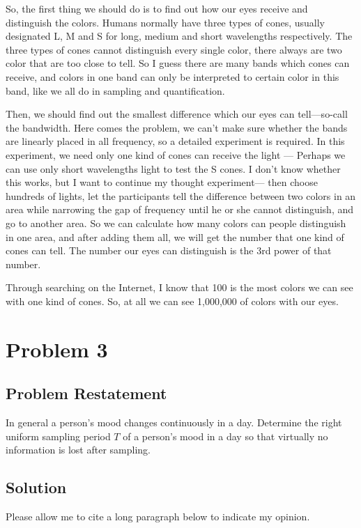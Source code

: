\documentclass{article}
\begin{document}
So, the first thing we should do is to find out how our eyes receive and distinguish the colors. Humans normally have three types of cones, usually designated L, M and S for long, medium and short wavelengths respectively.\cite{enwiki:1107424454} The three types of cones cannot distinguish every single color, there always are two color that are too close to tell. So I guess there are many bands which cones can receive, and colors in one band can only be interpreted to certain color in this band, like we all do in sampling and quantification.

Then, we should find out the smallest difference which our eyes can tell---so-call the bandwidth. Here comes the problem, we can't make sure whether the bands are linearly placed in all frequency, so a detailed experiment is required. In this experiment, we need only one kind of cones can receive the light --- Perhaps we can use only short wavelengths light to test the S cones. I don't know whether this works, but I want to continue my thought experiment--- then choose hundreds of lights, let the participants tell the difference between two colors in an area while narrowing the gap of frequency until he or she cannot distinguish, and go to another area. So we can calculate how many colors can people distinguish in one area, and after adding them all, we will get the number that one kind of cones can tell. The number our eyes can distinguish is the 3rd power of that number.

Through searching on the Internet, I know that 100 is the most colors we can see with one kind of cones. So, at all we can see 1,000,000 of colors with our eyes.

\section{Problem 3}

\subsection{Problem Restatement}
In general a person’s mood changes continuously in a day. Determine the right uniform sampling period $T$ of a person’s
mood in a day so that virtually no information is lost after sampling.

\subsection{Solution}
Please allow me to cite a long paragraph below to indicate my opinion.
\end{document}
